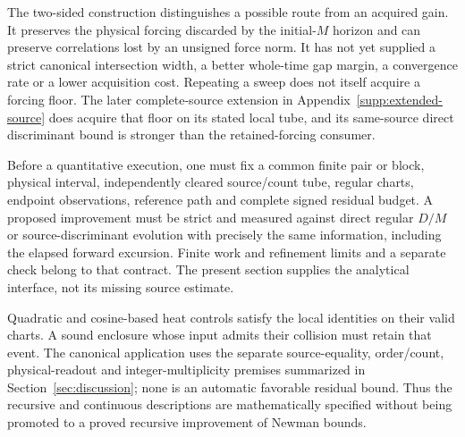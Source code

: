 The two-sided construction distinguishes a possible route from an
acquired gain. It preserves the physical forcing discarded by the
initial-$M$ horizon and can preserve correlations lost by an unsigned
force norm. It has not yet supplied a strict canonical intersection
width, a better whole-time gap margin, a convergence rate or a lower
acquisition cost. Repeating a sweep does not itself acquire a forcing floor. The later
complete-source extension in Appendix~\ref{supp:extended-source} does
acquire that floor on its stated local tube, and its same-source direct
discriminant bound is stronger than the retained-forcing consumer.

Before a quantitative execution, one must fix a common finite pair or
block, physical interval, independently cleared source/count tube,
regular charts, endpoint observations, reference path and complete
signed residual budget. A proposed improvement must be strict and
measured against direct regular $D/M$ or source-discriminant evolution
with precisely the same information, including the elapsed forward
excursion. Finite work and refinement limits and a separate check belong
to that contract. The present section supplies the analytical interface,
not its missing source estimate.

Quadratic and cosine-based heat controls satisfy the local identities on
their valid charts. A sound enclosure whose input admits their collision
must retain that event. The canonical application uses the separate
source-equality, order/count, physical-readout and integer-multiplicity
premises summarized in Section~\ref{sec:discussion}; none is an automatic
favorable residual bound. Thus the recursive and continuous descriptions
are mathematically specified without being promoted to a proved recursive
improvement of Newman bounds.

